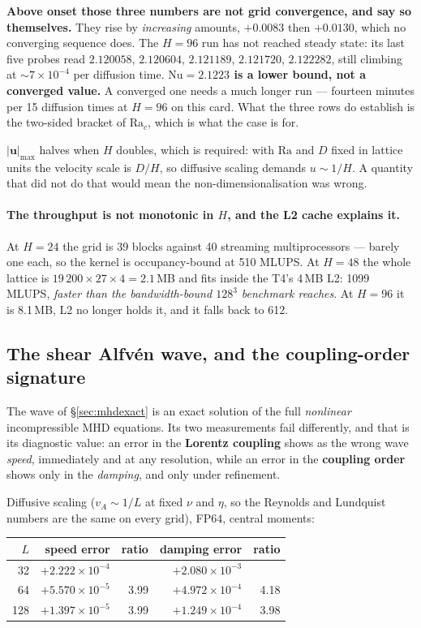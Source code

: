 \documentclass[11pt,a4paper]{article}
\newcommand{\uu}{\bm{u}}
\newcommand{\e}[1]{\times 10^{#1}}
\begin{document}
\textbf{Above onset those three numbers are not grid convergence, and say so
themselves.} They rise by \emph{increasing} amounts, $+0.0083$ then $+0.0130$,
which no converging sequence does. The $H=96$ run has not reached steady state:
its last five probes read $2.120058$, $2.120604$, $2.121189$, $2.121720$,
$2.122282$, still climbing at $\sim7\e{-4}$ per diffusion time.
\textbf{$\mathrm{Nu}=2.1223$ is a lower bound, not a converged value.} A
converged one needs a much longer run --- fourteen minutes per 15 diffusion times
at $H=96$ on this card. What the three rows do establish is the two-sided bracket
of $\mathrm{Ra}_c$, which is what the case is for.

$|\uu|_{\max}$ halves when $H$ doubles, which is required: with $\mathrm{Ra}$ and
$D$ fixed in lattice units the velocity scale is $D/H$, so diffusive scaling
demands $u \sim 1/H$. A quantity that did not do that would mean the
non-dimensionalisation was wrong.

\paragraph{The throughput is not monotonic in $H$, and the L2 cache explains it.}
At $H=24$ the grid is 39 blocks against 40 streaming multiprocessors --- barely
one each, so the kernel is occupancy-bound at 510 MLUPS. At $H=48$ the whole
lattice is $19\,200\times27\times4 = 2.1$\,MB and fits inside the T4's 4\,MB L2:
1099 MLUPS, \emph{faster than the bandwidth-bound $128^3$ benchmark reaches}. At
$H=96$ it is 8.1\,MB, L2 no longer holds it, and it falls back to 612.

\subsection{The shear Alfv\'en wave, and the coupling-order signature}

The wave of \S\ref{sec:mhdexact} is an exact solution of the full \emph{nonlinear}
incompressible MHD equations. Its two measurements fail differently, and that is
its diagnostic value: an error in the \textbf{Lorentz coupling} shows as the wrong
wave \emph{speed}, immediately and at any resolution, while an error in the
\textbf{coupling order} shows only in the \emph{damping}, and only under
refinement.

Diffusive scaling ($v_A \sim 1/L$ at fixed $\nu$ and $\eta$, so the Reynolds and
Lundquist numbers are the same on every grid), FP64, central moments:

\begin{center}\small
\begin{tabular}{rrrrr}
\toprule
$L$ & speed error & ratio & damping error & ratio \\
\midrule
32  & $+2.222\e{-4}$ &      & $+2.080\e{-3}$ &      \\
64  & $+5.570\e{-5}$ & 3.99 & $+4.972\e{-4}$ & 4.18 \\
128 & $+1.397\e{-5}$ & 3.99 & $+1.249\e{-4}$ & 3.98 \\
\bottomrule
\end{tabular}
\end{center}
\end{document}
